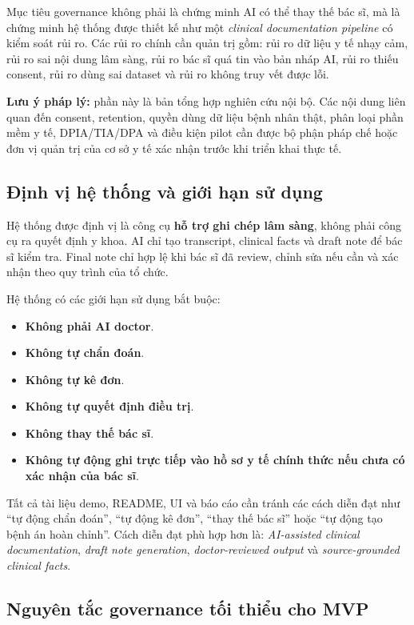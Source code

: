 \documentclass[12pt,a4paper]{article}
\begin{document}
Mục tiêu governance không phải là chứng minh AI có thể thay thế bác sĩ, mà là chứng minh hệ thống được thiết kế như một \textit{clinical documentation pipeline} có kiểm soát rủi ro. Các rủi ro chính cần quản trị gồm: rủi ro dữ liệu y tế nhạy cảm, rủi ro sai nội dung lâm sàng, rủi ro bác sĩ quá tin vào bản nháp AI, rủi ro thiếu consent, rủi ro dùng sai dataset và rủi ro không truy vết được lỗi.

\textbf{Lưu ý pháp lý:} phần này là bản tổng hợp nghiên cứu nội bộ. Các nội dung liên quan đến consent, retention, quyền dùng dữ liệu bệnh nhân thật, phân loại phần mềm y tế, DPIA/TIA/DPA và điều kiện pilot cần được bộ phận pháp chế hoặc đơn vị quản trị của cơ sở y tế xác nhận trước khi triển khai thực tế.

\subsection{Định vị hệ thống và giới hạn sử dụng}

Hệ thống được định vị là công cụ \textbf{hỗ trợ ghi chép lâm sàng}, không phải công cụ ra quyết định y khoa. AI chỉ tạo transcript, clinical facts và draft note để bác sĩ kiểm tra. Final note chỉ hợp lệ khi bác sĩ đã review, chỉnh sửa nếu cần và xác nhận theo quy trình của tổ chức.

Hệ thống có các giới hạn sử dụng bắt buộc:

\begin{itemize}
    \item \textbf{Không phải AI doctor}.
    \item \textbf{Không tự chẩn đoán}.
    \item \textbf{Không tự kê đơn}.
    \item \textbf{Không tự quyết định điều trị}.
    \item \textbf{Không thay thế bác sĩ}.
    \item \textbf{Không tự động ghi trực tiếp vào hồ sơ y tế chính thức nếu chưa có xác nhận của bác sĩ}.
\end{itemize}

Tất cả tài liệu demo, README, UI và báo cáo cần tránh các cách diễn đạt như ``tự động chẩn đoán'', ``tự động kê đơn'', ``thay thế bác sĩ'' hoặc ``tự động tạo bệnh án hoàn chỉnh''. Cách diễn đạt phù hợp hơn là: \textit{AI-assisted clinical documentation}, \textit{draft note generation}, \textit{doctor-reviewed output} và \textit{source-grounded clinical facts}.

\subsection{Nguyên tắc governance tối thiểu cho MVP}
\end{document}
